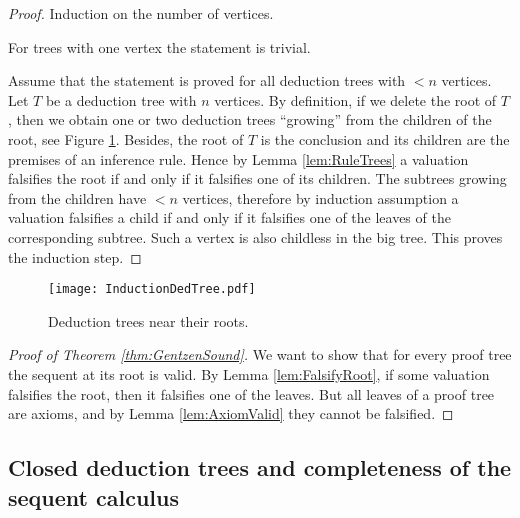 \begin{page}
\setcounter{section}{2}
\setcounter{subsection}{7}
\setcounter{dfn}{16}
\label{portion:468}

\begin{proof}
Induction on the number of vertices.

For trees with one vertex the statement is trivial.

Assume that the statement is proved for all deduction trees with $< n$ vertices.
Let $T$ be a deduction tree with $n$ vertices.
By definition, if we delete the root of $T$, then we obtain one or two deduction trees ``growing'' from the children of the root,
see Figure \ref{fig:InductionDedTree}.
Besides, the root of $T$ is the conclusion and its children are the premises of an inference rule.
Hence by Lemma \ref{lem:RuleTrees} a valuation falsifies the root if and only if it falsifies one of its children.
The subtrees growing from the children have $< n$ vertices,
therefore by induction assumption a valuation falsifies a child if and only if it falsifies one of the leaves of the corresponding subtree.
Such a vertex is also childless in the big tree.
This proves the induction step.
\end{proof}

\begin{figure}[ht]
\begin{center}
\texttt{[image: InductionDedTree.pdf]}
\end{center}
\caption{Deduction trees near their roots.}
\label{fig:InductionDedTree}
\end{figure}

\begin{proof}[Proof of Theorem \ref{thm:GentzenSound}]
We want to show that for every proof tree the sequent at its root is valid.
By Lemma \ref{lem:FalsifyRoot}, if some valuation falsifies the root, then it falsifies one of the leaves.
But all leaves of a proof tree are axioms, and by Lemma \ref{lem:AxiomValid} they cannot be falsified.
\end{proof}



\end{page}

\begin{page}
\setcounter{section}{2}
\setcounter{subsection}{7}
\setcounter{dfn}{16}
\label{portion:469}

\subsection{Closed deduction trees and completeness of the sequent calculus}

\end{page}

